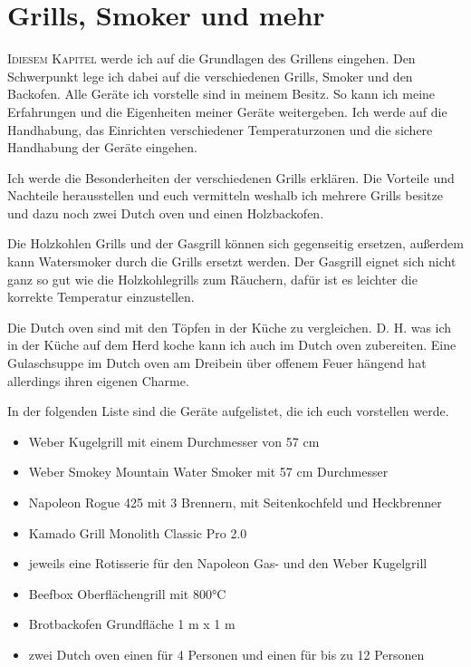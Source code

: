 \chapter{Grills, Smoker und mehr}\label{Chapter1}

	\lettrine[lines=3]{I}{diesem Kapitel} werde ich auf die Grundlagen des Grillens 
	eingehen. Den Schwerpunkt lege ich dabei auf die 
	verschiedenen Grills, Smoker und den Backofen. Alle Geräte ich vorstelle sind 
	in meinem Besitz. So kann ich  meine
	Erfahrungen und die Eigenheiten meiner Geräte weitergeben. Ich werde auf die 
	Handhabung, das Einrichten verschiedener
	Temperaturzonen und die sichere Handhabung der Geräte eingehen.
	
	Ich werde die Besonderheiten der verschiedenen Grills erklären. Die Vorteile 
	und Nachteile herausstellen und euch vermitteln
	weshalb ich mehrere Grills besitze und dazu noch zwei Dutch oven und einen 
	Holzbackofen.
	
	Die Holzkohlen Grills und der Gasgrill können sich gegenseitig ersetzen, 
	außerdem kann Watersmoker durch die Grills
	ersetzt werden. Der Gasgrill eignet sich nicht ganz so gut wie die 
	Holzkohlegrills zum Räuchern, dafür ist es leichter die korrekte Temperatur
	einzustellen.
	
	Die Dutch oven sind mit den Töpfen in der Küche zu vergleichen. D. H. was ich 
	in der Küche auf dem Herd koche kann
	ich auch im Dutch oven zubereiten. Eine Gulaschsuppe im Dutch oven am 
	Dreibein über offenem Feuer hängend hat allerdings ihren eigenen Charme.



In der folgenden Liste sind die Geräte aufgelistet, die ich euch vorstellen werde.

\begin{itemize}[noitemsep]
	\item Weber Kugelgrill mit einem Durchmesser von 57 cm
	\item Weber Smokey Mountain Water Smoker mit 57 cm Durchmesser
 	\item Napoleon Rogue 425 mit 3 Brennern, mit Seitenkochfeld und 
 	Heckbrenner
	\item Kamado Grill Monolith Classic Pro 2.0
	\item jeweils eine Rotisserie für den Napoleon Gas- und den Weber Kugelgrill
	\item Beefbox Oberflächengrill mit 800°C
	\item Brotbackofen Grundfläche 1 m x 1 m
	\item zwei Dutch oven einen für 4 Personen und einen für bis zu 12 Personen
\end{itemize}

